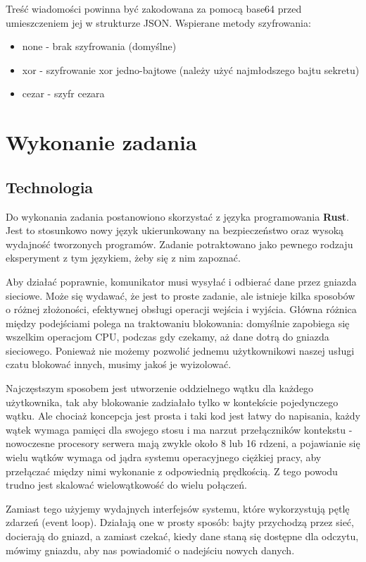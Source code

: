 \documentclass[11pt]{article}
\begin{document}
Treść wiadomości powinna być zakodowana za pomocą base64 przed umieszczeniem jej w strukturze JSON.
\newpage
Wspierane metody szyfrowania:
\begin{itemize}
    \item none - brak szyfrowania (domyślne)
    \item xor - szyfrowanie xor jedno-bajtowe (należy użyć najmłodszego bajtu sekretu)
    \item cezar - szyfr cezara
\end{itemize}


\section{Wykonanie zadania}

\subsection{Technologia}

Do wykonania zadania postanowiono skorzystać z języka programowania \textbf{Rust}. Jest to stosunkowo nowy język ukierunkowany na bezpieczeństwo oraz wysoką wydajność tworzonych programów. Zadanie potraktowano jako pewnego rodzaju eksperyment z tym językiem, żeby się z nim zapoznać.

Aby działać poprawnie, komunikator musi wysyłać i odbierać dane przez gniazda sieciowe.
Może się wydawać, że jest to proste zadanie, ale istnieje kilka sposobów o różnej złożoności, efektywnej obsługi operacji wejścia i wyjścia. Główna różnica między podejściami polega na traktowaniu blokowania: domyślnie zapobiega się wszelkim operacjom CPU, podczas gdy czekamy, aż dane dotrą do gniazda sieciowego. Ponieważ nie możemy pozwolić jednemu użytkownikowi naszej usługi czatu blokować innych, musimy jakoś je wyizolować.

Najczęstszym sposobem jest utworzenie oddzielnego wątku dla każdego użytkownika, tak aby blokowanie zadziałało tylko w kontekście pojedynczego wątku. Ale chociaż koncepcja jest prosta i taki kod jest łatwy do napisania, każdy wątek wymaga pamięci dla swojego stosu i ma narzut przełączników kontekstu - nowoczesne procesory serwera mają zwykle około 8 lub 16 rdzeni, a pojawianie się wielu wątków wymaga od jądra systemu operacyjnego ciężkiej pracy, aby przełączać między nimi wykonanie z odpowiednią prędkością. Z tego powodu trudno jest skalować wielowątkowość do wielu połączeń.

Zamiast tego użyjemy wydajnych interfejsów systemu, które wykorzystują pętlę zdarzeń (event loop). Działają one w prosty sposób: bajty przychodzą przez sieć, docierają do gniazd, a zamiast czekać, kiedy dane staną się dostępne dla odczytu, mówimy gniazdu, aby nas powiadomić o nadejściu nowych danych.
\end{document}
